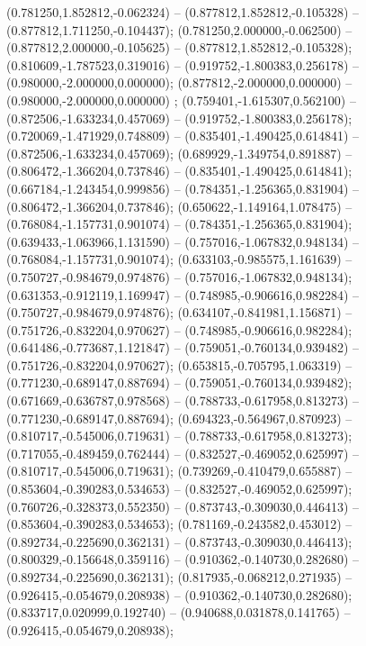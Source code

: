  (0.781250,1.852812,-0.062324) -- (0.877812,1.852812,-0.105328) -- (0.877812,1.711250,-0.104437);
 (0.781250,2.000000,-0.062500) -- (0.877812,2.000000,-0.105625) -- (0.877812,1.852812,-0.105328);
 (0.810609,-1.787523,0.319016) -- (0.919752,-1.800383,0.256178) -- (0.980000,-2.000000,0.000000);
 (0.877812,-2.000000,0.000000) -- (0.980000,-2.000000,0.000000) ;
 (0.759401,-1.615307,0.562100) -- (0.872506,-1.633234,0.457069) -- (0.919752,-1.800383,0.256178);
 (0.720069,-1.471929,0.748809) -- (0.835401,-1.490425,0.614841) -- (0.872506,-1.633234,0.457069);
 (0.689929,-1.349754,0.891887) -- (0.806472,-1.366204,0.737846) -- (0.835401,-1.490425,0.614841);
 (0.667184,-1.243454,0.999856) -- (0.784351,-1.256365,0.831904) -- (0.806472,-1.366204,0.737846);
 (0.650622,-1.149164,1.078475) -- (0.768084,-1.157731,0.901074) -- (0.784351,-1.256365,0.831904);
 (0.639433,-1.063966,1.131590) -- (0.757016,-1.067832,0.948134) -- (0.768084,-1.157731,0.901074);
 (0.633103,-0.985575,1.161639) -- (0.750727,-0.984679,0.974876) -- (0.757016,-1.067832,0.948134);
 (0.631353,-0.912119,1.169947) -- (0.748985,-0.906616,0.982284) -- (0.750727,-0.984679,0.974876);
 (0.634107,-0.841981,1.156871) -- (0.751726,-0.832204,0.970627) -- (0.748985,-0.906616,0.982284);
 (0.641486,-0.773687,1.121847) -- (0.759051,-0.760134,0.939482) -- (0.751726,-0.832204,0.970627);
 (0.653815,-0.705795,1.063319) -- (0.771230,-0.689147,0.887694) -- (0.759051,-0.760134,0.939482);
 (0.671669,-0.636787,0.978568) -- (0.788733,-0.617958,0.813273) -- (0.771230,-0.689147,0.887694);
 (0.694323,-0.564967,0.870923) -- (0.810717,-0.545006,0.719631) -- (0.788733,-0.617958,0.813273);
 (0.717055,-0.489459,0.762444) -- (0.832527,-0.469052,0.625997) -- (0.810717,-0.545006,0.719631);
 (0.739269,-0.410479,0.655887) -- (0.853604,-0.390283,0.534653) -- (0.832527,-0.469052,0.625997);
 (0.760726,-0.328373,0.552350) -- (0.873743,-0.309030,0.446413) -- (0.853604,-0.390283,0.534653);
 (0.781169,-0.243582,0.453012) -- (0.892734,-0.225690,0.362131) -- (0.873743,-0.309030,0.446413);
 (0.800329,-0.156648,0.359116) -- (0.910362,-0.140730,0.282680) -- (0.892734,-0.225690,0.362131);
 (0.817935,-0.068212,0.271935) -- (0.926415,-0.054679,0.208938) -- (0.910362,-0.140730,0.282680);
 (0.833717,0.020999,0.192740) -- (0.940688,0.031878,0.141765) -- (0.926415,-0.054679,0.208938);

